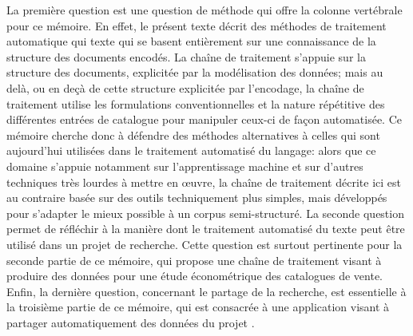 La première question est une question de méthode qui offre la colonne vertébrale pour ce mémoire. En effet, le présent texte décrit des méthodes de traitement automatique qui texte qui se basent entièrement sur une connaissance de la structure des documents encodés. La chaîne de traitement s'appuie sur la structure des documents, explicitée par la modélisation des données; mais au delà, ou en deçà de cette structure explicitée par l'encodage, la chaîne de traitement utilise les formulations conventionnelles et la nature répétitive des différentes entrées de catalogue pour manipuler ceux-ci de façon automatisée. Ce mémoire cherche donc à défendre des méthodes alternatives à celles qui sont aujourd'hui utilisées dans le traitement automatisé du langage: alors que ce domaine s'appuie notamment sur l'apprentissage machine et sur d'autres techniques très lourdes à mettre en œuvre, la chaîne de traitement décrite ici est au contraire basée sur des outils techniquement plus simples, mais développés pour s'adapter le mieux possible à un corpus semi-structuré. La seconde question permet de réfléchir à la manière dont le traitement automatisé du texte peut être utilisé dans un projet de recherche. Cette question est surtout pertinente pour la seconde partie de ce mémoire, qui propose une chaîne de traitement visant à produire des données pour une étude économétrique des catalogues de vente. Enfin, la dernière question, concernant le partage de la recherche, est essentielle à la troisième partie de ce mémoire, qui est consacrée à une application visant à partager automatiquement des données du projet \mssktb{}.

